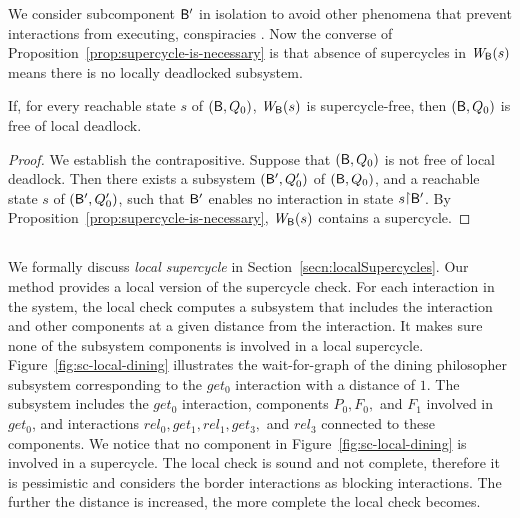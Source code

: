 We consider subcomponent $\mathsf{B}'$ in isolation to avoid other phenomena that prevent interactions from executing, \eg
conspiracies \cite{AFG93}.  
Now the converse of Proposition~\ref{prop:supercycle-is-necessary} is that absence of
supercycles in $\mathit{W}_{\mathsf{B}}({s})$ means there is no locally deadlocked subsystem. 



\begin{corollary}
\label{cor:static:dead-free}
If, for every reachable state $s$ of $(\mathsf{B},Q_0)$, $\mathit{W}_{\mathsf{B}}({s})$ is supercycle-free, then
$(\mathsf{B},Q_0)$ is free of local deadlock.
\end{corollary}
%
\begin{proof}
We establish the contrapositive.
Suppose that $(\mathsf{B}, Q_0)$ is not free of local deadlock. Then there exists a subsystem $(\mathsf{B}', Q'_0)$ of $(\mathsf{B}, Q_0)$, and
a reachable state $s$ of $(\mathsf{B}', Q'_0)$, such that $\mathsf{B}'$ enables no interaction in state  $s \pj \B'$.
By Proposition~\ref{prop:supercycle-is-necessary}, $\mathit{W}_{\mathsf{B}}({s})$ contains a supercycle.
\end{proof}




\subsection{}
We formally discuss {\em local supercycle} in Section~\ref{secn:localSupercycles}.
Our method provides a local version of the supercycle check. 
For each interaction in the system, the local check computes a subsystem 
that includes the interaction and other components at a given distance from 
the interaction. 
It makes sure none of the subsystem components is involved in a local supercycle. 
%
Figure~\ref{fig:sc-local-dining} illustrates the wait-for-graph of the dining philosopher subsystem 
corresponding to the $get_0$ interaction with a distance of $1$. 
The subsystem includes the $get_0$ interaction, 
components $P_0, F_0,$ and $F_1$ involved in $get_0$, 
and interactions $rel_0, get_1, rel_1, get_3,$ and $rel_3$ connected to these components. 
We notice that no component in Figure~\ref{fig:sc-local-dining} is involved in a supercycle. 
%
The local check is sound and not complete, therefore it is pessimistic and considers 
the border interactions as blocking interactions. 
The further the distance is increased, the more complete the local check becomes. 

